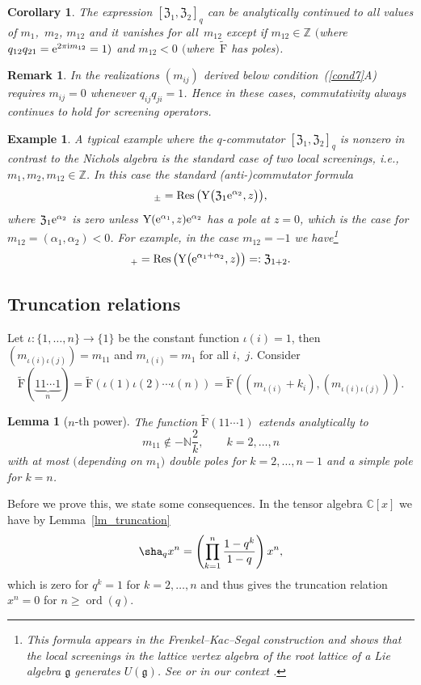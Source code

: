 \documentclass[pdftex]{sigma}%
\numberwithin{equation}{section}
\newtheorem{cor}[teo]{Corollary}
\newtheorem{lem}[teo]{Lemma}
\newtheorem{ese}[teo]{Example}
\newtheorem{oss}[teo]{Remark} }
\newcommand{\N}{\mathbb{N}}
\newcommand{\Z}{\mathbb{Z}}
\newcommand{\C}{\mathbb{C}}
\renewcommand{\i}{\mathrm{i}}
\newcommand{\Y}{\mathrm{Y}}
\newcommand{\g}{\mathfrak{g}}
\newcommand{\zem}{\mathfrak{Z}}
\newcommand{\rFp}{\tilde{\mathrm{F}}}
\begin{document}
\begin{cor}The expression $[\zem_1,\zem_2]_q$ can be analytically continued to all values of $m_1$,~$m_2$, $m_{12}$ and it vanishes for all~$m_{12}$ except if $m_{12}\in \Z$ $($where $q_{12}q_{21}={\rm e}^{2\pi\i m_{12}}=1)$ and $m_{12}< 0$ $($where~$\rFp$ has poles$)$.
\end{cor}	
\begin{oss}
	In the realizations $(m_{ij})$ derived below condition~(\ref{cond7}A) requires $m_{ij}=0$ whenever $q_{ij}q_{ji}=1$. Hence in these cases, commutativity always continues to hold for screening operators.
\end{oss}
\begin{ese}\label{ex_notcommuative}
	A typical example where the $q$-commutator $[\zem_1,\zem_2]_q$ is nonzero in contrast to the Nichols algebra is the standard case of two local screenings, i.e., $m_1,m_2,m_{12}\in\Z$. In this case the standard (anti-)commutator formula
	\begin{gather*}
	[\zem_1,\zem_2]_\pm =\operatorname{Res}\big(\Y\big(\zem_1{\rm e}^{\alpha_2},z\big)\big),
	\end{gather*}
	where $\zem_1{\rm e}^{\alpha_2}$ is zero unless $\Y({\rm e}^{\alpha_1},z){\rm e}^{\alpha_2}$ has a pole at $z=0$, which is the case for $m_{12}=(\alpha_1,\alpha_2)\allowbreak <0$. For example, in the case $m_{12}=-1$ we have\footnote{This formula appears in the Frenkel--Kac--Segal construction and shows that the local screenings in the lattice vertex algebra of the root lattice of a Lie algebra $\g$ generates $U(\g)$. See \cite[Section~5.6]{Kac98} or in our context \cite[Section~3.6]{Len17}.}
	\begin{gather*}
	[\zem_1,\zem_2]_+ =\operatorname{Res}\big(\Y\big({\rm e}^{\alpha_1+\alpha_2},z\big)\big)=:\zem_{1+2}.
	\end{gather*}
\end{ese}	
	
\subsection{Truncation relations}\label{sec_truncation}
Let $\iota\colon \{1,\dots,n\}\to \{1\}$ be the constant function $\iota(i)=1$, then $(m_{\iota(i)\iota(j)})=m_{11}$ and $m_{\iota(i)}=m_1$ for all $i$,~$j$. Consider
\[\rFp(\underbrace{11\cdots 1}_n)=\rFp(\iota(1)\iota(2)\cdots \iota(n))=\rFp((m_{\iota(i)}+k_i),(m_{\iota(i)\iota(j)})).\]
\begin{lem}[$n$-th power]\label{lm_rFpTrunc}
	The function $\rFp(11\cdots 1)$ extends analytically to
	\[m_{11}\not\in -\N\frac{2}{k},\qquad k=2,\dots, n\]
	with at most $($depending on $m_1)$ double poles for $k=2,\dots, n-1$ and a simple pole for $k=n$.
\end{lem}
Before we prove this, we state some consequences. In the tensor algebra $\C[x]$ we have by Lemma~\ref{lm_truncation}
\[
\sha_q x^n=\left(\prod_{k=1}^n\frac{1-q^k}{1-q} \right)x^n,
\]
which is zero for $q^k=1$ for $k=2,\dots, n$ and thus gives the truncation relation $x^n=0$ for $n\geq \operatorname{ord}(q)$.
\end{document}
